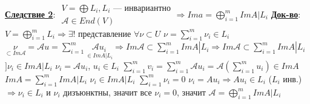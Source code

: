 \documentclass[12pt,a4paper]{article}
\newcommand{\bfline}[1]{\textbf{\underline{#1}}}
\begin{document}
\bfline{Следствие 2}: \newline
$
\begin{array}{r}
V = \bigoplus L_i, L_i\text{ --- инвариантно} \\
\mathcal{A} \in End(V)
\end{array} \Rightarrow Im a = \bigoplus\limits_{i=1}^{m} Im A|L_i
$ \newline
\bfline{Док-во}: \newline
$V = \bigoplus\limits_{i=1}^{m} L_i \Rightarrow \exists !$ представление $\forall \nu \subset U$ $\nu = \sum\limits_{i=1}^{m} \nu_i \in L_i$ \newline
$\underset{\subset Im \mathcal{A}}{\nu} = \mathcal{A}u = \sum\limits_{i=1}^{m} \underset{\in Im A|L_i}{\mathcal{A} u_i} \Rightarrow Im \mathcal{A} \subset \sum\limits_{i=1}^{m} Im A|L_i \Rightarrow Im \mathcal{A} \subset \sum\limits_{i=1}^{m} Im A|L_i$ \newline
$] \nu_i \in Im A|L_i$ $\nu_i = \mathcal{A} u_i$, $u_i \in L_i$ \newline
$\sum\limits_{i=1}^{m} v_i = \sum\limits_{i=1}^{m} \mathcal{A} u_i = \mathcal{A} \left( \sum\limits_{i=1}^{m} u_i \right) \in Im A$ \newline
$Im A = \sum\limits_{i=1}^{m} Im A|L_i$ \newline
$\nu_i \in Im A|L_i$ $\sum\limits_{i=1}^{m} \nu_i = 0$ \newline
$\nu_i = A u_i \Rightarrow A u_i \in L_i$ ($L_i$ инв.) $\Rightarrow \nu_i \in L_i$ и $\nu_i$ дизъюнктны, значит все $\nu_i=0$, значит $\mathcal{A}=\bigoplus\limits_{i=1}^{m} Im A|L_i$ 
\end{document}
